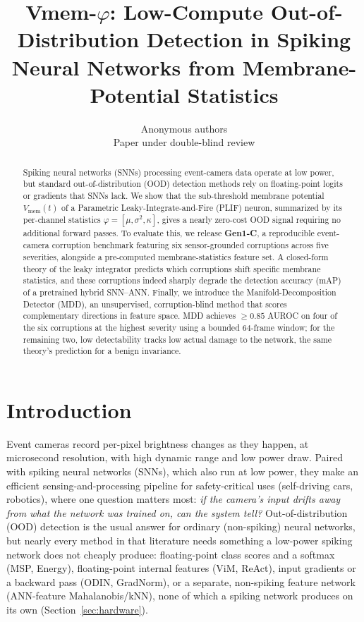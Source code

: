 ﻿\documentclass{article} %
\title{Vmem-$\varphi$: Low-Compute Out-of-Distribution Detection in Spiking\\
Neural Networks from Membrane-Potential Statistics}
\author{Anonymous authors\\Paper under double-blind review}
\theoremstyle{remark}
\begin{document}
\maketitle

\begin{abstract}
Spiking neural networks (SNNs) processing event-camera data operate at low power, but standard
out-of-distribution (OOD) detection methods rely on floating-point logits or gradients that SNNs
lack. We show that the sub-threshold membrane potential $V_{\mathrm{mem}}(t)$ of a Parametric
Leaky-Integrate-and-Fire (PLIF) neuron, summarized by its per-channel statistics
$\varphi = [\mu, \sigma^2, \kappa]$, gives a nearly zero-cost OOD signal requiring no additional
forward passes. To evaluate this, we release \textbf{Gen1-C}, a reproducible event-camera
corruption benchmark featuring six sensor-grounded corruptions across five severities, alongside a
pre-computed membrane-statistics feature set. A closed-form theory of the leaky integrator predicts
which corruptions shift specific membrane statistics, and these corruptions indeed sharply degrade
the detection accuracy (mAP) of a pretrained hybrid SNN--ANN. Finally, we introduce the
Manifold-Decomposition Detector (MDD), an unsupervised, corruption-blind method that scores
complementary directions in feature space. MDD achieves $\geq 0.85$ AUROC on four of the six
corruptions at the highest severity using a bounded $64$-frame window; for the remaining two, low
detectability tracks low actual damage to the network, the same theory's prediction for a benign
invariance.
\end{abstract}

\section{Introduction}
\label{sec:intro}

Event cameras record per-pixel brightness changes as they happen, at microsecond resolution, with
high dynamic range and low power draw. Paired with spiking neural networks (SNNs), which also run
at low power, they make an efficient sensing-and-processing pipeline for safety-critical uses
(self-driving cars, robotics), where one question matters most:
\emph{if the camera's input drifts away from what the network was trained on, can the system tell?}
Out-of-distribution (OOD) detection is the usual answer for ordinary (non-spiking) neural
networks, but nearly every method in that literature needs something a low-power spiking network
does not cheaply produce: floating-point class scores and a softmax (MSP, Energy), floating-point
internal features (ViM, ReAct), input gradients or a backward pass (ODIN, GradNorm), or a separate,
non-spiking feature network (ANN-feature Mahalanobis/kNN), none of which a spiking network produces
on its own (Section~\ref{sec:hardware}).
\end{document}
